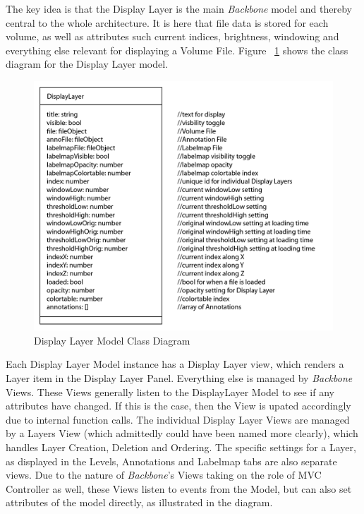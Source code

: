 \documentclass[a4paper,11pt,twoside]{article}
\begin{document}
The key idea is that the Display Layer is the main \textit{Backbone} model and thereby central to the whole architecture. It is here that file data is stored for each volume, as well as attributes such current indices, brightness, windowing and everything else relevant for displaying a Volume File. Figure ~\ref{fig:layerUML} shows the class diagram for the Display Layer model.


\begin{figure}[ht!]
\centering
\includegraphics[width=140mm]{graphics/displayLayerUML_01.png}
\caption{Display Layer Model Class Diagram}
\label{fig:layerUML}
\end{figure}

Each Display Layer Model instance has a Display Layer view, which renders a Layer item in the Display Layer Panel. Everything else is managed by \textit{Backbone} Views. These Views generally listen to the DisplayLayer Model to see if any attributes have changed. If this is the case, then the View is upated accordingly due to internal function calls. The individual Display Layer Views are managed by a Layers View (which admittedly could have been named more clearly), which handles Layer Creation, Deletion and Ordering. The specific settings for a Layer, as displayed in the Levels, Annotations and Labelmap tabs are also separate views. Due to the nature of \textit{Backbone}'s Views taking on the role of MVC Controller as well, these Views listen to events from the Model, but can also set attributes of the model directly, as illustrated in the diagram.
\end{document}
